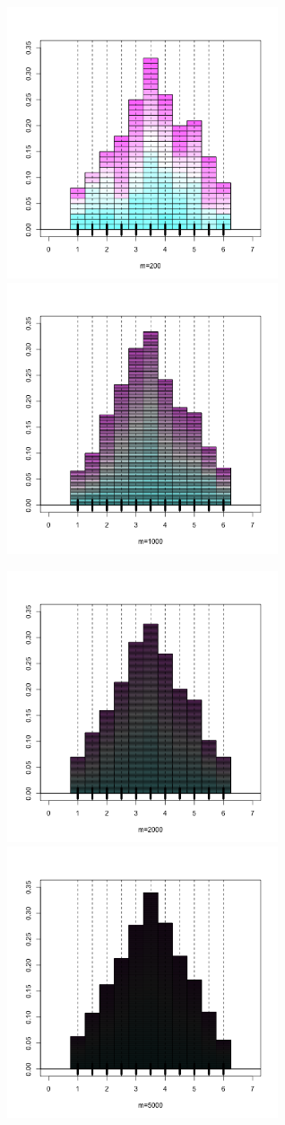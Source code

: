\documentclass[10pt]{report}
\begin{document}
\begin{exercice}
\centerline{\includegraphics[width=8cm,height=8cm]{img/deuxDes200} \includegraphics[width=8cm,height=8cm]{img/deuxDes1000}}
\centerline{\includegraphics[width=8cm,height=8cm]{img/deuxDes2000} \includegraphics[width=8cm,height=8cm]{img/deuxDes5000}}



\end{exercice}
\end{document}
